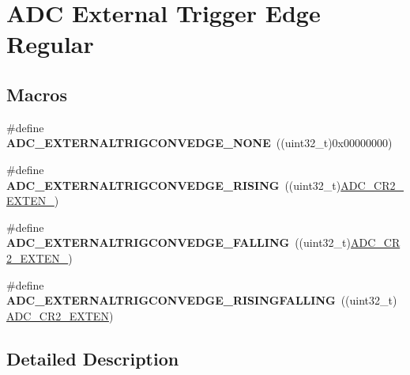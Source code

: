 \hypertarget{group___a_d_c___external__trigger__edge___regular}{}\section{A\+DC External Trigger Edge Regular}
\label{group___a_d_c___external__trigger__edge___regular}
\subsection*{Macros}
\begin{DoxyCompactItemize}
\item 
\#define {\bfseries A\+D\+C\+\_\+\+E\+X\+T\+E\+R\+N\+A\+L\+T\+R\+I\+G\+C\+O\+N\+V\+E\+D\+G\+E\+\_\+\+N\+O\+NE}~((uint32\+\_\+t)0x00000000)\hypertarget{group___a_d_c___external__trigger__edge___regular_gab2e3a19c05441925f9b9a482238994ac}{}\label{group___a_d_c___external__trigger__edge___regular_gab2e3a19c05441925f9b9a482238994ac}

\item 
\#define {\bfseries A\+D\+C\+\_\+\+E\+X\+T\+E\+R\+N\+A\+L\+T\+R\+I\+G\+C\+O\+N\+V\+E\+D\+G\+E\+\_\+\+R\+I\+S\+I\+NG}~((uint32\+\_\+t)\hyperlink{group___peripheral___registers___bits___definition_ga3519da0cc6fbd31444a16244c70232e6}{A\+D\+C\+\_\+\+C\+R2\+\_\+\+E\+X\+T\+E\+N\+\_})\hypertarget{group___a_d_c___external__trigger__edge___regular_ga0aaa4e876de630733ca4ca4116b9608e}{}\label{group___a_d_c___external__trigger__edge___regular_ga0aaa4e876de630733ca4ca4116b9608e}

\item 
\#define {\bfseries A\+D\+C\+\_\+\+E\+X\+T\+E\+R\+N\+A\+L\+T\+R\+I\+G\+C\+O\+N\+V\+E\+D\+G\+E\+\_\+\+F\+A\+L\+L\+I\+NG}~((uint32\+\_\+t)\hyperlink{group___peripheral___registers___bits___definition_ga17e37edddbb6ad791bffb350cca23d4d}{A\+D\+C\+\_\+\+C\+R2\+\_\+\+E\+X\+T\+E\+N\+\_})\hypertarget{group___a_d_c___external__trigger__edge___regular_ga15975c01b6a514f346272a1373239c54}{}\label{group___a_d_c___external__trigger__edge___regular_ga15975c01b6a514f346272a1373239c54}

\item 
\#define {\bfseries A\+D\+C\+\_\+\+E\+X\+T\+E\+R\+N\+A\+L\+T\+R\+I\+G\+C\+O\+N\+V\+E\+D\+G\+E\+\_\+\+R\+I\+S\+I\+N\+G\+F\+A\+L\+L\+I\+NG}~((uint32\+\_\+t)\hyperlink{group___peripheral___registers___bits___definition_ga574b4d8e90655d0432882d620e629234}{A\+D\+C\+\_\+\+C\+R2\+\_\+\+E\+X\+T\+EN})\hypertarget{group___a_d_c___external__trigger__edge___regular_gab4221f5f52b5f75dc8cea701bb57be35}{}\label{group___a_d_c___external__trigger__edge___regular_gab4221f5f52b5f75dc8cea701bb57be35}

\end{DoxyCompactItemize}


\subsection{Detailed Description}
